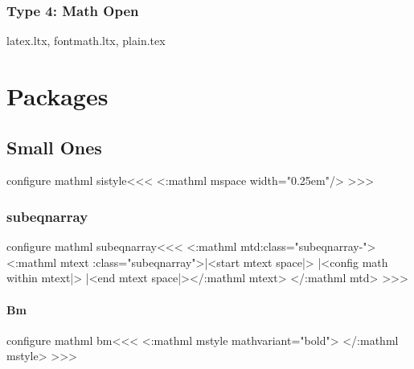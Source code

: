 {{{{{{%
\subsection{Type 4: Math Open}


latex.ltx, fontmath.ltx, plain.tex



\chapter{Packages}

\section{Small Ones}



\<configure mathml sistyle\><<<
  {\ifmathml
     \ifmtext\else \Tg<\a:mathml mspace width="0.25em"/>\fi
   \fi}
>>>


\subsection{subeqnarray}

\<configure mathml subeqnarray\><<<
   {}%
   {}
   {}  {}
   {\Tg<\a:mathml mtd\Hnewline \mml:class="subeqnarray-\HCol">
      \ifnum {}
        \Tg<\a:mathml mtext 
             \mml:class="subeqnarray">|<start mtext space|>\PauseMathClass 
        \mtexttrue
        |<config math within mtext|>%
      \fi}
   {\ifnum {} \mtextfalse 
      \EndPauseMathClass|<end mtext space|>\Tg</\a:mathml mtext>\fi
      \Tg</\a:mathml mtd>}
>>>


\subsubsection{Bm}


\<configure mathml bm\><<<
  {\ifmmode \ifmtext \else
     \Tg<\a:mathml mstyle 
             mathvariant="bold">%
     \expandafter\expandafter\expandafter{}
   \fi\fi}
  {\ifmmode \ifmtext \else \Tg</\a:mathml mstyle>\fi\fi}
>>>


}}}}}}
